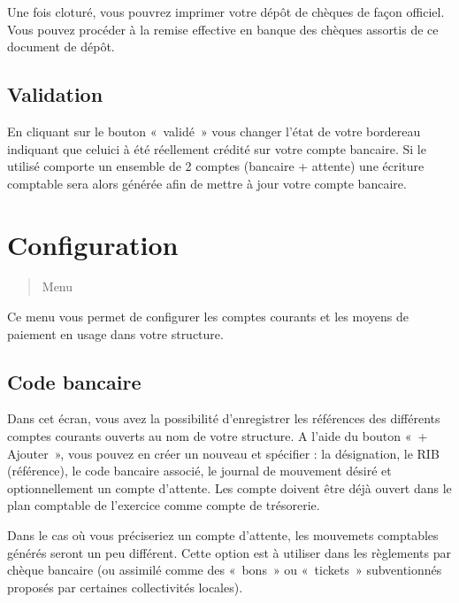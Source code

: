 \documentclass[a4paper,10pt,oneside,french]{sphinxmanual}
\begin{document}
\sphinxAtStartPar
Une fois cloturé, vous pouvrez imprimer votre dépôt de chèques de façon officiel.
Vous pouvez procéder à la remise effective en banque des chèques assortis de ce document de dépôt.


\subsection{Validation}
\label{\detokenize{payoff/deposit:validation}}
\sphinxAtStartPar
En cliquant sur le bouton « validé » vous changer l’état de votre bordereau indiquant que celui\sphinxhyphen{}ci à été réellement crédité sur votre compte bancaire.
Si le  utilisé comporte un ensemble de 2 comptes (bancaire + attente) une écriture comptable sera alors générée afin de mettre à jour votre compte bancaire.

\sphinxstepscope


\section{Configuration}
\label{\detokenize{payoff/config:configuration}}\label{\detokenize{payoff/config::doc}}\begin{quote}

\sphinxAtStartPar
Menu 
\end{quote}

\sphinxAtStartPar
Ce menu vous permet de configurer les comptes courants et les moyens de paiement en usage dans votre structure.


\subsection{Code bancaire}
\label{\detokenize{payoff/config:code-bancaire}}
\sphinxAtStartPar
Dans cet écran, vous avez la possibilité d’enregistrer les références des différents comptes courants ouverts au nom de votre structure.
A l’aide du bouton « + Ajouter », vous pouvez en créer un nouveau et spécifier : la désignation, le RIB (référence), le code bancaire associé, le journal de mouvement désiré et optionnellement un compte d’attente.
Les compte doivent être déjà ouvert dans le plan comptable de l’exercice comme compte de trésorerie.

\sphinxAtStartPar
Dans le cas où vous préciseriez un compte d’attente, les mouvemets comptables générés seront un peu différent.
Cette option est à utiliser dans les règlements par chèque bancaire (ou assimilé comme des « bons » ou « tickets » subventionnés proposés par certaines collectivités locales).
\end{document}
